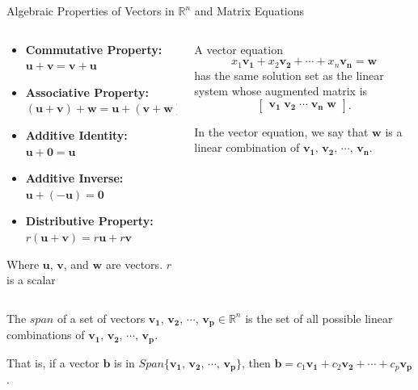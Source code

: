 \documentclass[10pt, aspectratio=169]{beamer}
\begin{document}
\begin{frame}{Algebraic Properties of Vectors in \(\mathbb{R}^n\) and Matrix Equations}
    \begin{columns}
    \begin{column}{0.4\textwidth}
    
    \begin{itemize}
        \item \textbf{Commutative Property:} \( \mathbf{u} + \mathbf{v} = \mathbf{v} + \mathbf{u} \)
        \item \textbf{Associative Property:} \( (\mathbf{u} + \mathbf{v}) + \mathbf{w} = \mathbf{u} + (\mathbf{v} + \mathbf{w}) \)
        \item \textbf{Additive Identity:} \( \mathbf{u} + \mathbf{0} = \mathbf{u} \)
        \item \textbf{Additive Inverse:} \( \mathbf{u} + (-\mathbf{u}) = \mathbf{0} \)
        \item \textbf{Distributive Property:} \( r(\mathbf{u} + \mathbf{v}) = r\mathbf{u} + r\mathbf{v} \)
    \end{itemize}

    \scriptsize{
    Where \(\mathbf{u}\), \(\mathbf{v}\), and \(\mathbf{w}\) are vectors.
    \(r\) is a scalar 
    \vspace{0.2cm}
    }
    \end{column}
    
    
    \begin{column}{0.6\textwidth}
    A vector equation \[x_1\mathbf{v_1} + x_2\mathbf{v_2} + \cdots + x_n\mathbf{v_n} = \mathbf{w}\]
    has the same solution set as the linear system whose augmented matrix is
    \[
    \begin{bmatrix}
        \mathbf{v_1} \; \mathbf{v_2} \; \cdots \; \mathbf{v_n} \;  \mathbf{w}
    \end{bmatrix}.
    \]

    In the vector equation, we say that \(\mathbf{w}\) is a linear combination of  \(\mathbf{v_1}, \, \mathbf{v_2}, \, \cdots, \, \mathbf{v_n}. \)

    \end{column}
    \end{columns}

    \begin{definition}
        The \(span\) of a set of vectors \(\mathbf{v_1}, \, \mathbf{v_2}, \, \cdots, \, \mathbf{v_p} \in \mathbb{R}^n\) is the set of all possible linear combinations of  \(\mathbf{v_1}, \, \mathbf{v_2}, \, \cdots, \, \mathbf{v_p}\).
    \end{definition}
    That is, if a vector \(\mathbf{b}\) is in \(Span\{\mathbf{v_1}, \, \mathbf{v_2}, \, \cdots, \, \mathbf{v_p}\}\), then \(\mathbf{b} = c_1\mathbf{v_1} + c_2\mathbf{v_2} + \cdots + c_p\mathbf{v_p}\).
\end{frame}
\end{document}
